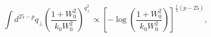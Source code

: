\begin{equation} %
  \int d^{25-p}q_{\bot} \left(\frac{1+W_0^2}{k_0 W_0^2} \right)^{q_{\bot}^2}
\propto 
\left[-\log\left(\frac{1+W_0^2}{k_0 W_0^2}\right)\right]^{\frac{1}{2}(p-25)},
\end{equation} 
